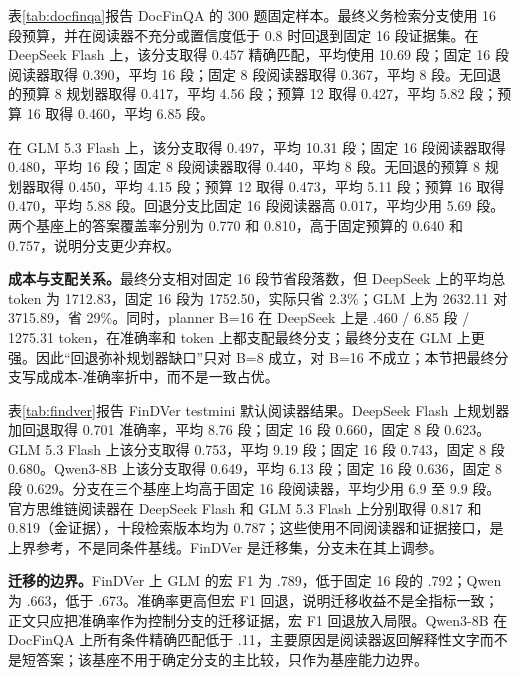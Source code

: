 

表\ref{tab:docfinqa}报告 DocFinQA 的 300 题固定样本。最终义务检索分支使用 16 段预算，并在阅读器不充分或置信度低于 0.8 时回退到固定 16 段证据集。在 DeepSeek Flash 上，该分支取得 0.457 精确匹配，平均使用 10.69 段；固定 16 段阅读器取得 0.390，平均 16 段；固定 8 段阅读器取得 0.367，平均 8 段。无回退的预算 8 规划器取得 0.417，平均 4.56 段；预算 12 取得 0.427，平均 5.82 段；预算 16 取得 0.460，平均 6.85 段。

在 GLM 5.3 Flash 上，该分支取得 0.497，平均 10.31 段；固定 16 段阅读器取得 0.480，平均 16 段；固定 8 段阅读器取得 0.440，平均 8 段。无回退的预算 8 规划器取得 0.450，平均 4.15 段；预算 12 取得 0.473，平均 5.11 段；预算 16 取得 0.470，平均 5.88 段。回退分支比固定 16 段阅读器高 0.017，平均少用 5.69 段。两个基座上的答案覆盖率分别为 0.770 和 0.810，高于固定预算的 0.640 和 0.757，说明分支更少弃权。

\begin{revbox}
\noindent\textbf{成本与支配关系。}最终分支相对固定 16 段节省段落数，但 DeepSeek 上的平均总 token 为 1712.83，固定 16 段为 1752.50，实际只省 2.3\%；GLM 上为 2632.11 对 3715.89，省 29\%。同时，planner B=16 在 DeepSeek 上是 .460 / 6.85 段 / 1275.31 token，在准确率和 token 上都支配最终分支；最终分支在 GLM 上更强。因此“回退弥补规划器缺口”只对 B=8 成立，对 B=16 不成立；本节把最终分支写成成本-准确率折中，而不是一致占优。
\end{revbox}



表\ref{tab:findver}报告 FinDVer testmini 默认阅读器结果。DeepSeek Flash 上规划器加回退取得 0.701 准确率，平均 8.76 段；固定 16 段 0.660，固定 8 段 0.623。GLM 5.3 Flash 上该分支取得 0.753，平均 9.19 段；固定 16 段 0.743，固定 8 段 0.680。Qwen3-8B 上该分支取得 0.649，平均 6.13 段；固定 16 段 0.636，固定 8 段 0.629。分支在三个基座上均高于固定 16 段阅读器，平均少用 6.9 至 9.9 段。官方思维链阅读器在 DeepSeek Flash 和 GLM 5.3 Flash 上分别取得 0.817 和 0.819（金证据），十段检索版本均为 0.787；这些使用不同阅读器和证据接口，是上界参考，不是同条件基线。FinDVer 是迁移集，分支未在其上调参。

\begin{revbox}
\noindent\textbf{迁移的边界。}FinDVer 上 GLM 的宏 F1 为 .789，低于固定 16 段的 .792；Qwen 为 .663，低于 .673。准确率更高但宏 F1 回退，说明迁移收益不是全指标一致；正文只应把准确率作为控制分支的迁移证据，宏 F1 回退放入局限。Qwen3-8B 在 DocFinQA 上所有条件精确匹配低于 .11，主要原因是阅读器返回解释性文字而不是短答案；该基座不用于确定分支的主比较，只作为基座能力边界。
\end{revbox}

